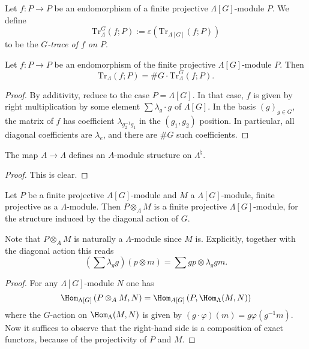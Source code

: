 \begin{definition}
\label{definition-trace-G}
Let $f: P\to P$ be an
endomorphism of a finite projective $\Lambda[G]$-module
$P$. We define
$$
\text{Tr}_{\Lambda}^G(f; P) := \varepsilon\left(\text{Tr}_{\Lambda[G]}(f;
P)\right)
$$
to be the {\it $G$-trace of $f$ on $P$}.
\end{definition}

\begin{lemma}
\label{lemma-lambda-trace}
Let $f: P\to P$ be an endomorphism of the finite projective
$\Lambda[G]$-module $P$. Then
$$
\text{Tr}_{\Lambda}(f; P) = \# G \cdot \text{Tr}_\Lambda^G(f; P).
$$
\end{lemma}

\begin{proof}
By additivity, reduce to the case $P = \Lambda[G]$.
In that case, $f$ is given by
right multiplication by some element $\sum\lambda_g\cdot g$ of $\Lambda[G]$. In
the basis $(g)_{g \in G}$, the matrix of $f$ has coefficient
$\lambda_{g_2^{-1}g_1}$ in the $(g_1, g_2)$ position. In particular, all
diagonal coefficients are $\lambda_e$, and there are $\#G$ such coefficients.
\end{proof}

\begin{lemma}
\label{lemma-A-module-structure}
The map $A\to \Lambda$ defines an $A$-module structure on $\Lambda^\natural$.
\end{lemma}

\begin{proof}
This is clear.
\end{proof}

\begin{lemma}
\label{lemma-diagonal-action-projective-module}
Let $P$ be a finite projective $A[G]$-module and $M$ a $\Lambda[G]$-module,
finite projective as a $\Lambda$-module. Then $P \otimes_A M$ is a finite
projective $\Lambda[G]$-module, for the structure induced by the diagonal
action of $G$.
\end{lemma}

\noindent
Note that $P \otimes_A M$ is naturally a $\Lambda$-module since $M$ is.
Explicitly, together with the diagonal action this reads
$$
\left(\sum\lambda_g g\right)\left(p \otimes m\right)
=
\sum g p \otimes \lambda_g g m.
$$

\begin{proof}
For any $\Lambda[G]$-module $N$ one has
$$
\Hom_{\Lambda[G]}\left(P \otimes_A M, N\right)= \Hom_{A[G]}\left(P,
\Hom_{\Lambda}(M, N)\right)
$$
where the $G$-action on $\Hom_{\Lambda}(M, N)$ is given by $(g\cdot
\varphi)(m) = g \varphi (g^{-1} m) $. Now it suffices to observe that the
right-hand side is a composition of exact functors, because of the projectivity
of $P$ and $M$.
\end{proof}

